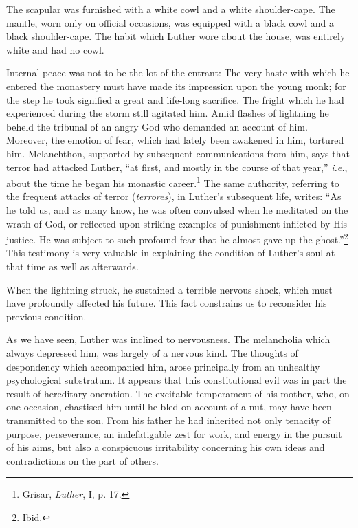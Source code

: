 The scapular was furnished with a white cowl and a white shoulder-cape. The mantle, worn only on official occasions, was equipped with
a black cowl and a black shoulder-cape. The habit which Luther
wore about the house, was entirely white and had no cowl.

Internal peace was not to be the lot of the entrant: The very haste
with which he entered the monastery must have made its impression
upon the young monk; for the step he took signified a great and
life-long sacrifice. The fright which he had experienced during the
storm still agitated him. Amid flashes of lightning he beheld the
tribunal of an angry God who demanded an account of him. Moreover,
the emotion of fear, which had lately been awakened in him,
tortured him. Melanchthon, supported by subsequent communications
from him, says that terror had attacked Luther, “at first, and
mostly in the course of that year,” \textit{i.e.}, about the time he began his monastic career.\footnote
{Grisar, \textit{Luther}, I, p. 17.}
The same authority, referring to the frequent attacks of terror (\textit{terrores}), in Luther’s
subsequent life, writes: “As he told us, and as many know, he was often
convulsed when he meditated on the wrath of God, or reflected upon striking
examples of punishment inflicted by His justice. He was subject to such
profound fear that he almost gave up the ghost.”\footnote{Ibid.}
This testimony is very valuable in explaining the condition of Luther’s soul at that time as well as afterwards.

When the lightning struck, he sustained a terrible nervous shock, which must have profoundly affected his future.
This fact constrains us to reconsider his previous condition.

As we have seen, Luther was inclined to nervousness. The melancholia
which always depressed him, was largely of a nervous kind. The thoughts
of despondency which accompanied him, arose principally from an unhealthy
psychological substratum. It appears that this constitutional evil was
in part the result of hereditary oneration. The excitable temperament of
his mother, who, on one occasion, chastised him until he bled on account of a nut, may have
been transmitted to the son. From his father he had inherited not
only tenacity of purpose, perseverance, an indefatigable zest for
work, and energy in the pursuit of his aims, but also a conspicuous
irritability concerning his own ideas and contradictions on the part
of others.

